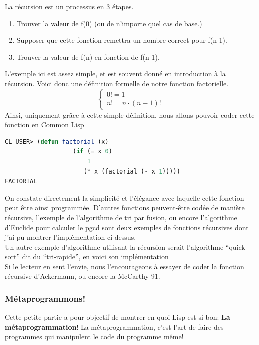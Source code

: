 \documentclass[a4paper, 12pt]{article}
\numberwithin{equation}{subsection}
\begin{document}
La récursion est un processus en 3 étapes. \\
\begin{enumerate}
  \item Trouver la valeur de f(0) (ou de n'importe quel cas de base.)
  \item Supposer que cette fonction remettra un nombre correct pour f(n-1).
  \item Trouver la valeur de f(n) en fonction de f(n-1).
\end{enumerate}
L'exemple ici est assez simple, et est souvent donné en introduction à la récursion. Voici donc une définition formelle de notre fonction factorielle. \\
$$\begin{cases}0! = 1 \\ n! = n \cdot (n - 1)! \end{cases}$$
Ainsi, uniquement grâce à cette simple définition, nous allons pouvoir coder cette fonction en Common Lisp \\
\begin{lstlisting}[language=Lisp]
CL-USER> (defun factorial (x)
                   (if (= x 0)
                       1
                      (* x (factorial (- x 1)))))
FACTORIAL
\end{lstlisting}
On constate directement la simplicité et l'élégance avec laquelle cette fonction peut être ainsi programmée. D'autres fonctions peuvent-être codée de manière récursive, l'exemple de l'algorithme de tri par fusion, ou encore l'algorithme d'Euclide pour calculer le pgcd sont deux exemples de fonctions récursives dont j'ai pu montrer l'implémentation ci-dessus. \\

Un autre exemple d'algorithme utilisant la récursion serait l'algorithme ``quick-sort'' dit du ``tri-rapide'', en voici son implémentation \\


Si le lecteur en sent l'envie, nous l'encourageons à essayer de coder la fonction récursive d'Ackermann, ou encore la McCarthy 91. \\
\subsubsection{Métaprogrammons!}
Cette petite partie a pour objectif de montrer en quoi Lisp est si bon: {\bf La métaprogrammation}!
La métaprogrammation, c'est l'art de faire des programmes qui manipulent le code du programme même!\\
\end{document}
